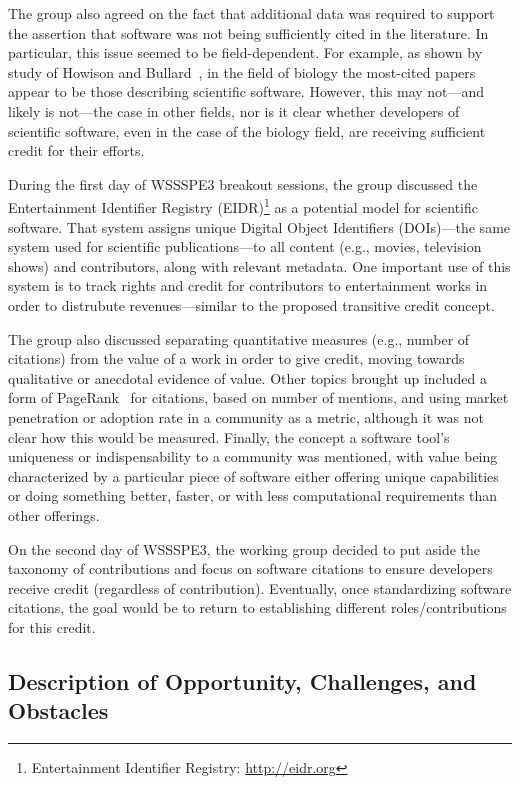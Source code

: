 The group also agreed on the fact that additional data was required to support the assertion that software was not being sufficiently cited in the literature.
In particular, this issue seemed to be field-dependent.
For example, as shown by study of Howison and Bullard~\cite{Howison2015}, in the field of biology the most-cited papers appear to be those describing scientific software.
However, this may not---and likely is not---the case in other fields, nor is it clear whether developers of scientific software, even in the case of the biology field, are receiving sufficient credit for their efforts.

During the first day of WSSSPE3 breakout sessions, the group discussed the Entertainment Identifier Registry (EIDR)\footnote{Entertainment Identifier Registry: \url{http://eidr.org}} as a potential model for scientific software.
That system assigns unique Digital Object Identifiers (DOIs)---the same system used for scientific publications---to all content (e.g., movies, television shows) and contributors, along with relevant metadata.
One important use of this system is to track rights and credit for contributors to entertainment works in order to distrubute revenues---similar to the proposed transitive credit concept.

The group also discussed separating quantitative measures (e.g., number of citations) from the value of a work in order to give credit, moving towards qualitative or anecdotal evidence of value.
Other topics brought up included a form of PageRank~\cite{Brin1998} for citations, based on number of mentions, and using market penetration or adoption rate in a community as a metric, although it was not clear how this would be measured.
Finally, the concept a software tool's uniqueness or indispensability to a community was mentioned, with value being characterized by a particular piece of software either offering unique capabilities or doing something better, faster, or with less computational requirements than other offerings.

On the second day of WSSSPE3, the working group decided to put aside the taxonomy of contributions and focus on software citations to ensure developers receive credit (regardless of contribution).
Eventually, once standardizing software citations, the goal would be to return to establishing different roles\slash contributions for this credit.




\subsection{Description of Opportunity, Challenges, and Obstacles}

